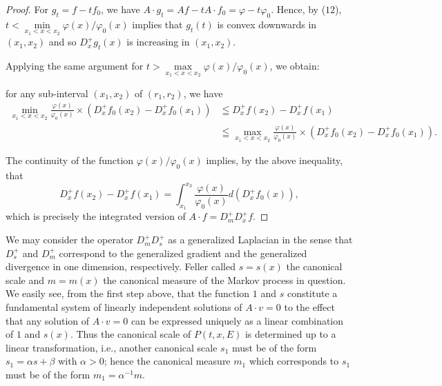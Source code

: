 \begin{proof}
For $g_{t} = f - tf_{0}$, we have $A \cdot g_{t} = Af - tA \cdot f_{0} = \varphi - t\varphi_{0}$. Hence, by ($12$), 
$t < \min\limits_{x_1<x<x_2} \varphi(x) / \varphi_0(x)$ implies that $g_t(t)$ is convex downwards in $(x_1, x_2)$ and so $D_x^+ g_t(x)$ is increasing in $(x_1, x_2)$. 

Applying the same argument for $t > \max\limits_{x_1<x<x_2} \varphi(x) / \varphi_0(x)$, we obtain: 

for any sub-interval $(x_{1}, x_{2})$ of $(r_1, r_2)$, we have 
\[
\begin{aligned}
\min\limits _ {x _{1} < x < x _{2}} \frac {\varphi (x)}{\varphi_{0} (x)} \times (D _{x} ^{+} f _{0} (x _{2}) - D _{x} ^{+} f _{0} (x _{1}))& \leqq D _{x} ^{+} f (x _{2}) - D _{x} ^{+} f (x _{1})
\\
\quad& \leqq \max\limits _ {x _{1} < x < x _{2}} \frac {\varphi (x)}{\varphi_{0} (x)} \times (D _{x} ^{+} f _{0} (x _{2}) - D _{x} ^{+} f _{0} (x _{1})).
\end{aligned}
\]

The continuity of the function $\varphi(x)/\varphi_{0}(x)$ implies, by the above inequality, that 
\[
D _{x} ^{+} f (x _{2}) - D _{x} ^{+} f (x _{1}) = \int_ {x _{1}} ^ {x _{3}} \frac {\varphi (x)}{\varphi_{0} (x)} d \left(D _{x} ^{+} f _{0} (x)\right),
\]
which is precisely the integrated version of $A \cdot f = D_{m}^{+}D_{x}^{+}f$.
\end{proof}

\begin{remarkn}[Remark $1$] We may consider the operator $D_{m}^{+}D_{s}^{+}$ as a generalized Laplacian in the sense that $D_{s}^{+}$ and $D_{m}^{+}$ correspond to the generalized gradient and the generalized divergence in one dimension, respectively. Feller called $s = s(x)$ the canonical scale and $m = m(x)$ the canonical measure of the Markov process in question. We easily see, from the first step above, that the function $1$ and $s$ constitute a fundamental system of linearly independent solutions of $A\cdot v = 0$ to the effect that any solution of $A\cdot v = 0$ can be expressed uniquely as a linear combination of $1$ and $s(x)$. Thus the canonical scale of $P(t,x,E)$ is determined up to a linear transformation, i.e., another canonical scale $s_1$ must be of the form $s_1 = \alpha s + \beta$ with $\alpha >0$; hence the canonical measure $m_1$ which corresponds to $s_1$ must be of the form $m_1 = \alpha^{-1}m$. 
\end{remarkn}


